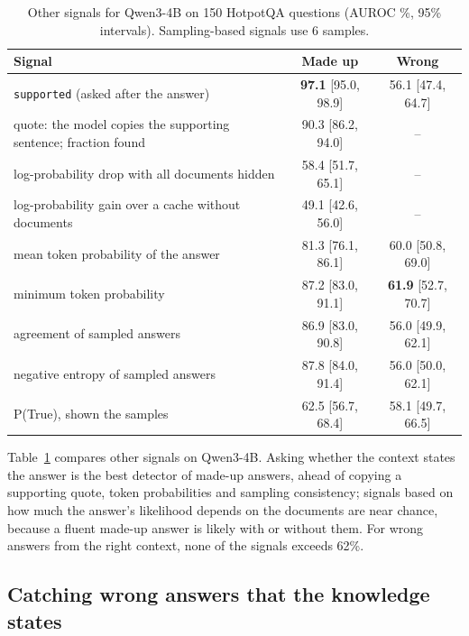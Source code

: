 \documentclass[11pt]{article}
\newcommand{\best}[1]{\textbf{#1}}
\begin{document}
\begin{table}[t]
\centering
\small
\caption{Other signals for Qwen3-4B on 150 HotpotQA questions (AUROC \%, 95\% intervals). Sampling-based signals use 6 samples.}
\label{tab:signals}
\begin{tabular}{lcc}
\toprule
Signal & Made up & Wrong \\
\midrule
\texttt{supported} (asked after the answer) & \best{97.1} [95.0, 98.9] & 56.1 [47.4, 64.7] \\
quote: the model copies the supporting sentence; fraction found & 90.3 [86.2, 94.0] & -- \\
log-probability drop with all documents hidden & 58.4 [51.7, 65.1] & -- \\
log-probability gain over a cache without documents & 49.1 [42.6, 56.0] & -- \\
mean token probability of the answer & 81.3 [76.1, 86.1] & 60.0 [50.8, 69.0] \\
minimum token probability & 87.2 [83.0, 91.1] & \best{61.9} [52.7, 70.7] \\
agreement of sampled answers~\citep{manakul2023selfcheckgpt} & 86.9 [83.0, 90.8] & 56.0 [49.9, 62.1] \\
negative entropy of sampled answers~\citep{kuhn2023semantic} & 87.8 [84.0, 91.4] & 56.0 [50.0, 62.1] \\
P(True), shown the samples~\citep{kadavath2022know} & 62.5 [56.7, 68.4] & 58.1 [49.7, 66.5] \\
\bottomrule
\end{tabular}
\end{table}

Table~\ref{tab:signals} compares other signals on Qwen3-4B. Asking whether the context states the answer is the best detector of made-up answers, ahead of copying a supporting quote, token probabilities and sampling consistency; signals based on how much the answer's likelihood depends on the documents are near chance, because a fluent made-up answer is likely with or without them. For wrong answers from the right context, none of the signals exceeds 62\%.

\subsection{Catching wrong answers that the knowledge states}
\label{sec:wrong}
\end{document}
